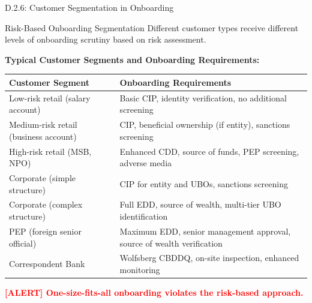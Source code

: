 \documentclass[11pt,a4paper]{beamer}
\newcommand{\redflag}[1]{\textcolor{red}{\textbf{[ALERT] #1}}}
\begin{document}
\begin{frame}{D.2.6: Customer Segmentation in Onboarding}
	\begin{block}{Risk-Based Onboarding Segmentation}
		Different customer types receive different levels of onboarding scrutiny based on risk assessment.
	\end{block}
	\textbf{Typical Customer Segments and Onboarding Requirements:}
	\begin{tabular}{p{}|p{}}
		\hline
		\rowcolor{lightgray}
		\textbf{Customer Segment} & \textbf{Onboarding Requirements} \\
		\hline
		Low-risk retail (salary account) & Basic CIP, identity verification, no additional screening \\
		\hline
		Medium-risk retail (business account) & CIP, beneficial ownership (if entity), sanctions screening \\
		\hline
		High-risk retail (MSB, NPO) & Enhanced CDD, source of funds, PEP screening, adverse media \\
		\hline
		Corporate (simple structure) & CIP for entity and UBOs, sanctions screening \\
		\hline
		Corporate (complex structure) & Full EDD, source of wealth, multi-tier UBO identification \\
		\hline
		PEP (foreign senior official) & Maximum EDD, senior management approval, source of wealth verification \\
		\hline
		Correspondent Bank & Wolfsberg CBDDQ, on-site inspection, enhanced monitoring \\
		\hline
	\end{tabular}
	\redflag{One-size-fits-all onboarding violates the risk-based approach.}
\end{frame}
\end{document}
